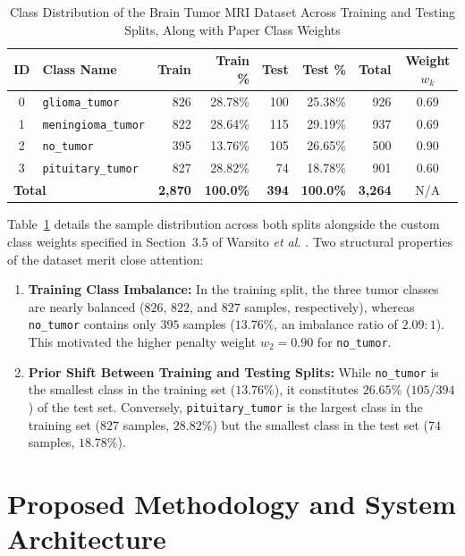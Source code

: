 \documentclass[conference]{IEEEtran}
\begin{document}
\begin{table}[t]
\centering
\caption{Class Distribution of the Brain Tumor MRI Dataset Across Training and Testing Splits, Along with Paper Class Weights}
\label{tab:dataset}
\setlength{\tabcolsep}{4.5pt}
\begin{tabular}{clrrrrrc}
\toprule
\textbf{ID} & \textbf{Class Name} & \textbf{Train} & \textbf{Train \%} & \textbf{Test} & \textbf{Test \%} & \textbf{Total} & \textbf{Weight $w_k$} \\
\midrule
0 & \texttt{glioma\_tumor}     &   826 & 28.78\% & 100 & 25.38\% &   926 & 0.69 \\
1 & \texttt{meningioma\_tumor} &   822 & 28.64\% & 115 & 29.19\% &   937 & 0.69 \\
2 & \texttt{no\_tumor}         &   395 & 13.76\% & 105 & 26.65\% &   500 & 0.90 \\
3 & \texttt{pituitary\_tumor}  &   827 & 28.82\% &  74 & 18.78\% &   901 & 0.60 \\
\midrule
\multicolumn{2}{l}{\textbf{Total}} & \textbf{2,870} & \textbf{100.0\%} & \textbf{394} & \textbf{100.0\%} & \textbf{3,264} & N/A \\
\bottomrule
\end{tabular}
\end{table}

Table~\ref{tab:dataset} details the sample distribution across both splits alongside the custom class weights specified in Section~3.5 of Warsito \emph{et al.} \cite{warsito2026lightweight}. Two structural properties of the dataset merit close attention:
\begin{enumerate}
    \item \textbf{Training Class Imbalance:} In the training split, the three tumor classes are nearly balanced ($826$, $822$, and $827$ samples, respectively), whereas \texttt{no\_tumor} contains only $395$ samples ($13.76\%$, an imbalance ratio of $2.09:1$). This motivated the higher penalty weight $w_2 = 0.90$ for \texttt{no\_tumor}.
    \item \textbf{Prior Shift Between Training and Testing Splits:} While \texttt{no\_tumor} is the smallest class in the training set ($13.76\%$), it constitutes $26.65\%$ ($105/394$) of the test set. Conversely, \texttt{pituitary\_tumor} is the largest class in the training set ($827$ samples, $28.82\%$) but the smallest class in the test set ($74$ samples, $18.78\%$).
\end{enumerate}

\section{Proposed Methodology and System Architecture}
\end{document}
